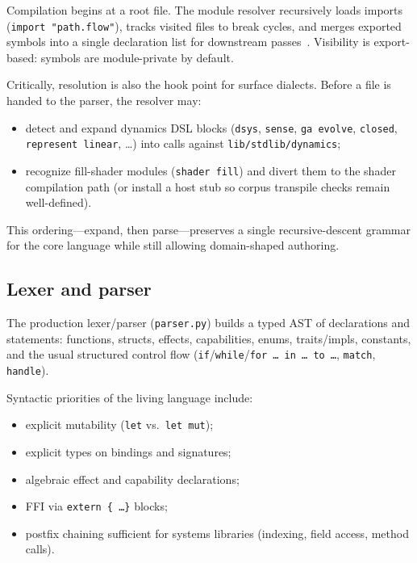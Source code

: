 \documentclass[11pt,a4paper]{article}
\theoremstyle{remark}
\begin{document}
Compilation begins at a root file. The module resolver recursively loads
imports (\texttt{import "path.flow"}), tracks visited files to break cycles,
and merges exported symbols into a single declaration list for downstream
passes~\cite{flow-readme}. Visibility is export-based: symbols are module-private
by default.

Critically, resolution is also the hook point for surface dialects. Before a
file is handed to the parser, the resolver may:

\begin{itemize}[leftmargin=*]
  \item detect and expand dynamics DSL blocks (\texttt{dsys}, \texttt{sense},
        \texttt{ga evolve}, \texttt{closed}, \texttt{represent linear}, \ldots)
        into calls against \texttt{lib/stdlib/dynamics};
  \item recognize fill-shader modules (\texttt{shader fill}) and divert them
        to the shader compilation path (or install a host stub so corpus
        transpile checks remain well-defined).
\end{itemize}

This ordering---expand, then parse---preserves a single recursive-descent
grammar for the core language while still allowing domain-shaped authoring.

\subsection{Lexer and parser}
\label{sec:parser}

The production lexer/parser (\texttt{parser.py}) builds a typed AST of
declarations and statements: functions, structs, effects, capabilities,
enums, traits/impls, constants, and the usual structured control flow
(\texttt{if}/\texttt{while}/\texttt{for \ldots\ in \ldots\ to \ldots},
\texttt{match}, \texttt{handle}).

Syntactic priorities of the living language include:

\begin{itemize}[leftmargin=*]
  \item explicit mutability (\texttt{let} vs.\ \texttt{let mut});
  \item explicit types on bindings and signatures;
  \item algebraic effect and capability declarations;
  \item FFI via \texttt{extern \{ \ldots \}} blocks;
  \item postfix chaining sufficient for systems libraries
        (indexing, field access, method calls).
\end{itemize}
\end{document}
